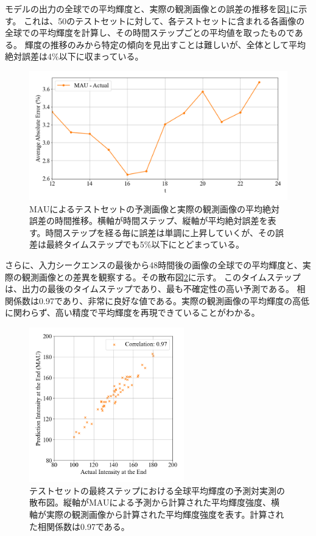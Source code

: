           モデルの出力の全球での平均輝度と、実際の観測画像との誤差の推移を図\ref{fig:exp1_mean_intensity_line}に示す。
          これは、50のテストセットに対して、各テストセットに含まれる各画像の全球での平均輝度を計算し、その時間ステップごとの平均値を取ったものである。
          輝度の推移のみから特定の傾向を見出すことは難しいが、全体として平均絶対誤差は4\%以下に収まっている。
          \begin{figure}[htbp]
            \centering
            \includegraphics[width=\textwidth]{figures/exp1/error.png}
            \caption{MAUによるテストセットの予測画像と実際の観測画像の平均絶対誤差の時間推移。横軸が時間ステップ、縦軸が平均絶対誤差を表す。時間ステップを経る毎に誤差は単調に上昇していくが、その誤差は最終タイムステップでも5\%以下にとどまっている。}
            \label{fig:exp1_mean_intensity_line}
          \end{figure}
          
          さらに、入力シークエンスの最後から48時間後の画像の全球での平均輝度と、実際の観測画像との差異を観察する。その散布図\ref{fig:exp1_mean_intensity_scatter}に示す。
          このタイムステップは、出力の最後のタイムステップであり、最も不確定性の高い予測である。
          相関係数は0.97であり、非常に良好な値である。実際の観測画像の平均輝度の高低に関わらず、高い精度で平均輝度を再現できていることがわかる。
          \begin{figure}[htbp]
            \centering
            \includegraphics[width=0.6\textwidth]{figures/exp1/intensity_scatter_gt_pd.png}
            \caption{テストセットの最終ステップにおける全球平均輝度の予測対実測の散布図。縦軸がMAUによる予測から計算された平均輝度強度、横軸が実際の観測画像から計算された平均輝度強度を表す。計算された相関係数は0.97である。}
            \label{fig:exp1_mean_intensity_scatter}
          \end{figure}

